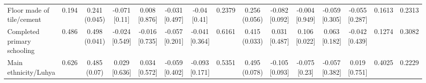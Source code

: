 \documentclass[
]{article}
\begin{document}
\begin{table}
{\begin{tabular}[t]{lcccccccccccccc}
\addlinespace[0.3em]
\hline
\multicolumn{15}{l}{\textit{\textbf{Panel B: Baseline demographics, $N=2,407$}}}\\
\hline
\hspace{1em}Floor made of tile/cement & 0.194 & \makecell[c]{0.241\\(0.045)} & \makecell[c]{-0.071\\{[0.11]}} & \makecell[c]{0.008\\{[0.876]}} & \makecell[c]{-0.031\\{[0.497]}} & \makecell[c]{-0.04\\{[0.41]}} & 0.2379 & \makecell[c]{0.256\\(0.056)} & \makecell[c]{-0.082\\{[0.092]}} & \makecell[c]{-0.004\\{[0.949]}} & \makecell[c]{-0.059\\{[0.305]}} & \makecell[c]{-0.055\\{[0.287]}} & 0.1613 & 0.2313\\
\hspace{1em}Completed primary schooling & 0.486 & \makecell[c]{0.498\\(0.041)} & \makecell[c]{-0.024\\{[0.549]}} & \makecell[c]{-0.016\\{[0.735]}} & \makecell[c]{-0.057\\{[0.201]}} & \makecell[c]{-0.041\\{[0.364]}} & 0.6161 & \makecell[c]{0.415\\(0.033)} & \makecell[c]{0.031\\{[0.487]}} & \makecell[c]{0.106\\{[0.022]}} & \makecell[c]{0.063\\{[0.182]}} & \makecell[c]{-0.042\\{[0.439]}} & 0.1274 & 0.3082\\
\hspace{1em}Main ethnicity/Luhya & 0.626 & \makecell[c]{0.485\\(0.07)} & \makecell[c]{0.029\\{[0.636]}} & \makecell[c]{0.034\\{[0.572]}} & \makecell[c]{-0.059\\{[0.402]}} & \makecell[c]{-0.093\\{[0.171]}} & 0.5351 & \makecell[c]{0.495\\(0.078)} & \makecell[c]{-0.105\\{[0.093]}} & \makecell[c]{-0.075\\{[0.23]}} & \makecell[c]{-0.057\\{[0.382]}} & \makecell[c]{0.019\\{[0.751]}} & 0.4025 & 0.2229\\

\end{tabular}}
\end{table}
\end{document}
